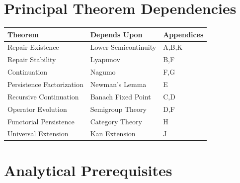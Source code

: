 \documentclass[11pt]{book}
\numberwithin{equation}{chapter}
\theoremstyle{definition}
\theoremstyle{plain}
\begin{document}

\section{Principal Theorem Dependencies}

\begin{center}

\begin{tabular}{lll}

Theorem &
Depends Upon &
Appendices
\\
\hline

Repair Existence &
Lower Semicontinuity &
A,B,K
\\

Repair Stability &
Lyapunov &
B,F
\\

Continuation &
Nagumo &
F,G
\\

Persistence Factorization &
Newman's Lemma &
E
\\

Recursive Continuation &
Banach Fixed Point &
C,D
\\

Operator Evolution &
Semigroup Theory &
D,F
\\

Functorial Persistence &
Category Theory &
H
\\

Universal Extension &
Kan Extension &
J

\end{tabular}

\end{center}


\section{Analytical Prerequisites}
\end{document}
